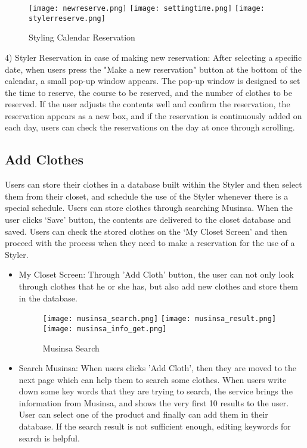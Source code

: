\documentclass[conference]{IEEEtran}
\begin{document}
\begin{figure}[htbp]
\centerline{
\texttt{[image: newreserve.png]}
\texttt{[image: settingtime.png]}
\texttt{[image: stylerreserve.png]}
}
\caption{Styling Calendar Reservation}
\label{fig}
\end{figure}
4) Styler Reservation in case of making new reservation: After selecting a specific date, when users press the "Make a new reservation" button at the bottom of the calendar, a small pop-up window appears. The pop-up window is designed to set the time to reserve, the course to be reserved, and the number of clothes to be reserved. If the user adjusts the contents well and confirm the reservation, the reservation appears as a new box, and if the reservation is continuously added on each day, users can check the reservations on the day at once through scrolling.\\

\subsection{Add Clothes}
Users can store their clothes in a database built within the Styler and then select them from their closet, and schedule the use of the Styler whenever there is a special schedule. Users can store clothes through searching Musinsa. When the user clicks ‘Save’ button, the contents are delivered to the closet database and saved. Users can check the stored clothes on the ‘My Closet Screen’ and then proceed with the process when they need to make a reservation for the use of a Styler.\\

\begin{itemize}
    \begin{figure}[htbp]
    \centerline{\texttt{[image: mycloset\_add.png]}}
    \label{fig}
    \caption{My Closet Screen}
    \end{figure}
    \item My Closet Screen: Through 'Add Cloth' button, the user can not only look through clothes that he or she has, but also add new clothes and store them in the database.\\
    
    \begin{figure}[htbp]
    \centerline{
        \texttt{[image: musinsa\_search.png]}
        \texttt{[image: musinsa\_result.png]}
        \texttt{[image: musinsa\_info\_get.png]}
    }
    \label{fig}
    \caption{Musinsa Search}
    \end{figure}
    \item Search Musinsa: When users clicks 'Add Cloth', then they are moved to the next page which can help them to search some clothes. When users write down some key words that they are trying to search, the service brings the information from Musinsa, and shows the very first 10 results to the user. User can select one of the product and finally can add them in their database. If the search result is not sufficient enough, editing keywords for search is helpful.\\

\end{itemize}
\end{document}
